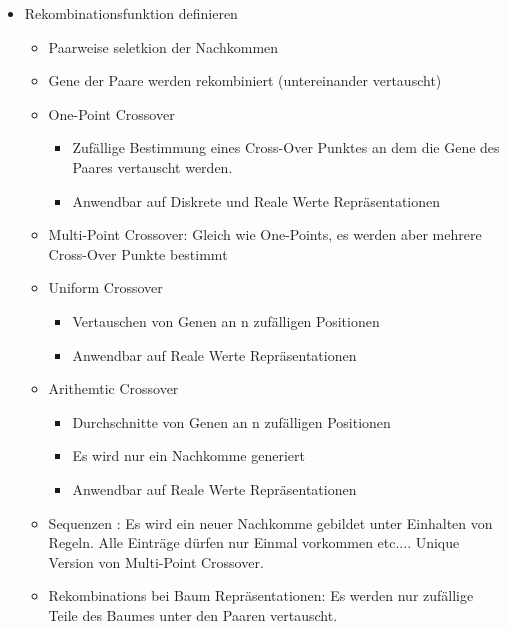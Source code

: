 \begin{itemize}
\begin{itemize}
          \end{itemize}

        \item Rekombinationsfunktion definieren
          \begin{itemize}
            \item Paarweise seletkion der Nachkommen
            \item Gene der Paare werden rekombiniert (untereinander vertauscht)
            \item One-Point Crossover
              \begin{itemize}
                \item Zufällige Bestimmung eines Cross-Over Punktes an dem die Gene des Paares vertauscht werden.
                \item Anwendbar auf Diskrete und Reale Werte Repräsentationen
              \end{itemize}
            \item Multi-Point Crossover: Gleich wie One-Points, es werden aber mehrere Cross-Over Punkte bestimmt
            \item Uniform Crossover
              \begin{itemize}
                \item Vertauschen von Genen an n zufälligen Positionen
                \item Anwendbar auf Reale Werte Repräsentationen
              \end{itemize}
            \item Arithemtic Crossover
              \begin{itemize}
                \item Durchschnitte von Genen an n zufälligen Positionen
                \item Es wird nur ein Nachkomme generiert
                \item Anwendbar auf Reale Werte Repräsentationen
              \end{itemize}
            \item Sequenzen : Es wird ein neuer Nachkomme gebildet unter Einhalten von Regeln. Alle Einträge dürfen nur Einmal vorkommen etc.... Unique Version von Multi-Point Crossover.
            \item Rekombinations bei Baum Repräsentationen: Es werden nur zufällige Teile des Baumes unter den Paaren vertauscht.
          \end{itemize}


\end{itemize}
